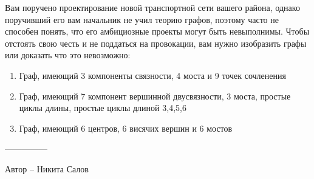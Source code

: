 \question
Вам поручено проектирование новой транспортной сети вашего района, однако поручивший его вам начальник не учил теорию графов, поэтому часто не способен понять, что его амбициозные проекты могут быть невыполнимы. Чтобы отстоять свою честь и не поддаться на провокации, вам нужно изобразить графы или доказать что это невозможно:

\begin{enumerate}
    \item Граф, имеющий 3 компоненты связности, 4 моста и 9 точек сочленения 
    \item Граф, имеющий 7 компонент вершинной двусвязности, 3 моста, простые циклы длины, простые циклы длиной 3,4,5,6
    \item Граф, имеющий 6 центров, 6 висячих вершин и 6 мостов
\end{enumerate}

---------------

Автор -- Никита Салов